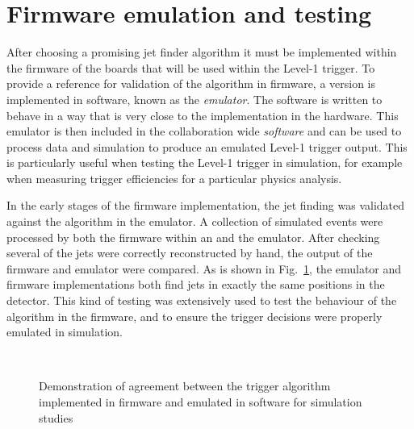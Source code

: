 \section{Firmware emulation and testing}
\label{sec:emu}

After choosing a promising jet finder algorithm it must be implemented
within the firmware of the \FPGA boards that will be used within the
Level-1 trigger. To provide a reference for validation of the
algorithm in firmware, a version is implemented in software, known as
the \emph{emulator}. The software is written to behave in a way that
is very close to the implementation in the \FPGA hardware. This
emulator is then included in the collaboration wide \emph{\CMS
software} and can be used to process data and simulation to produce an
emulated Level-1 trigger output. This is particularly useful when
testing the Level-1 trigger in simulation, for example when measuring
trigger efficiencies for a particular physics analysis. 

In the early stages of the firmware implementation, the jet finding
was validated against the algorithm in the emulator. A collection of
simulated events were processed by both the firmware within an \FPGA
and the emulator. After checking several of the jets were correctly
reconstructed by hand, the output of the firmware and emulator were
compared. As is shown in Fig.~\ref{fig:firmwareEmu}, the emulator and
firmware implementations both find jets in exactly the same positions
in the detector. This kind of testing was extensively used to test the
behaviour of the algorithm in the firmware, and to ensure the
trigger decisions were properly emulated in simulation.

\begin{figure}
  \centering
  ~ 
  \caption{Demonstration of agreement between the trigger algorithm
  implemented in firmware and emulated in software for simulation
  studies}
  \label{fig:firmwareEmu}
\end{figure}

